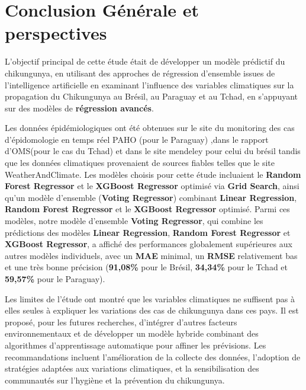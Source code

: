 \chapter*{Conclusion Générale et perspectives}

L'objectif principal de cette étude était de développer un modèle prédictif du chikungunya, en utilisant des approches de régression d'ensemble issues de l'intelligence artificielle en examinant l'influence des variables climatiques sur la propagation du Chikungunya au Brésil, au Paraguay et au Tchad, en s'appuyant sur des modèles de \textbf{régression avancés}. 

Les données épidémiologiques ont été obtenues sur le site du monitoring des cas d'épidomologie en temps réel PAHO (pour le Paraguay) ,dans le rapport d'OMS(pour le cas du Tchad) et dans le site mendeley pour celui du brésil tandis que les données climatiques provenaient de sources fiables telles que le site WeatherAndClimate.  Les modèles choisis pour cette étude incluaient le \textbf{Random Forest Regressor} et le \textbf{XGBoost Regressor} optimisé via \textbf{Grid Search}, ainsi qu'un modèle d'ensemble (\textbf{Voting Regressor}) combinant \textbf{Linear Regression}, \textbf{Random Forest Regressor} et le \textbf{XGBoost Regressor} optimisé. Parmi ces modèles, notre modèle d'ensemble \textbf{Voting Regressor}, qui combine les prédictions des modèles \textbf{Linear Regression}, \textbf{Random Forest Regressor} et \textbf{XGBoost Regressor}, a affiché des performances globalement supérieures aux autres modèles individuels, avec un \textbf{MAE} minimal, un \textbf{RMSE} relativement bas et une très bonne précision (\textbf{91,08\%} pour le Brésil, \textbf{34,34\%} pour le Tchad et \textbf{59,57\%} pour le Paraguay).

Les limites de l’étude ont montré que les variables climatiques ne suffisent pas à elles seules à expliquer les variations des cas de chikungunya dans ces pays. Il est proposé, pour les futures
recherches, d’intégrer d’autres facteurs environnementaux et de développer un modèle hybride combinant des algorithmes d’apprentissage automatique pour affiner les prévisions. Les recommandations incluent l’amélioration de la collecte des données, l’adoption de stratégies adaptées aux variations climatiques, et la sensibilisation des communautés sur l’hygiène et la prévention du chikungunya.







